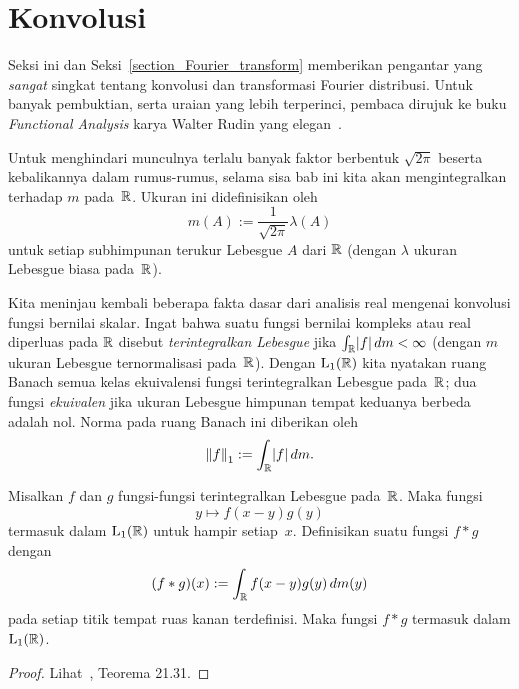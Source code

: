 \section{Konvolusi}

Seksi ini dan Seksi~\ref{section_Fourier_transform} memberikan pengantar yang \emph{sangat} singkat tentang konvolusi
dan transformasi Fourier distribusi. Untuk banyak pembuktian, serta uraian yang lebih terperinci, pembaca dirujuk
ke buku \emph{Functional Analysis} karya Walter Rudin yang elegan~\cite{Rudin:1991}.

Untuk menghindari munculnya terlalu banyak faktor berbentuk $\sqrt{2\pi}$ beserta kebalikannya dalam rumus-rumus, selama
sisa bab ini kita akan mengintegralkan terhadap
 $m$ pada~$\mathbb{R}$. Ukuran ini didefinisikan oleh
   \[ m(A) := \frac1{\sqrt{2\pi}}\lambda(A) \]
untuk setiap subhimpunan terukur Lebesgue $A$ dari $\mathbb{R}$ (dengan $\lambda$ ukuran Lebesgue biasa pada~$\mathbb{R}$).

Kita meninjau kembali beberapa fakta dasar dari analisis real mengenai konvolusi fungsi bernilai skalar. Ingat bahwa suatu fungsi bernilai kompleks atau
real diperluas pada $\mathbb{R}$ disebut
\emph{terintegralkan Lebesgue} jika $\int_{\mathbb{R}}\lvert f\rvert\, dm < \infty$
(dengan $m$ ukuran Lebesgue ternormalisasi pada~$\mathbb{R}$).
Dengan $\mathrm{L_{1}}(\mathbb{R})$ kita nyatakan ruang Banach semua kelas ekuivalensi fungsi terintegralkan Lebesgue pada~$\mathbb{R}$; dua fungsi \emph{ekuivalen}
jika ukuran Lebesgue himpunan tempat keduanya berbeda adalah nol. Norma pada ruang Banach ini
diberikan oleh
   \[ {\lVert f\rVert}_1 := \int_{\mathbb{R}} \lvert f\rvert\,dm. \]

\begin{prop} Misalkan $f$ dan $g$ fungsi-fungsi terintegralkan Lebesgue pada~$\mathbb{R}$. Maka fungsi
   \[ y \mapsto f(x - y)g(y) \]
termasuk dalam $\mathrm{L_{1}}(\mathbb{R})$ untuk hampir setiap~$x$. Definisikan suatu
fungsi $f \ast g$ dengan
   \[ (f \ast g)(x) := \int_{\mathbb{R}} f(x - y)g(y)\,dm(y) \]
pada setiap titik tempat ruas kanan terdefinisi. Maka fungsi $f \ast g$ termasuk dalam $\mathrm{L_{1}}(\mathbb{R})$.
\end{prop}

\begin{proof} Lihat~\cite{HewittS:1965}, Teorema 21.31.  \ns
\end{proof}

